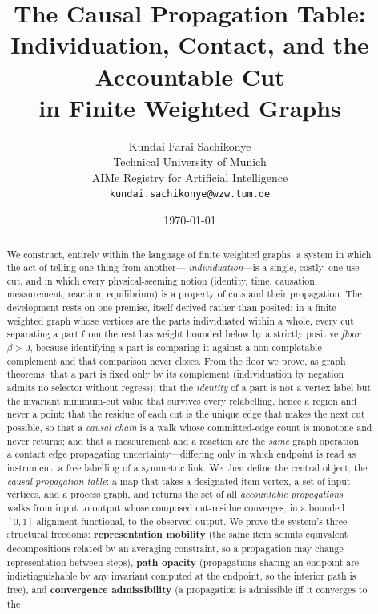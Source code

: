 \documentclass[11pt,twocolumn,a4paper]{article}
\title{\textbf{The Causal Propagation Table:\\[3pt]
Individuation, Contact, and the Accountable Cut\\
in Finite Weighted Graphs}}
\author{%
Kundai Farai Sachikonye\\
\small Technical University of Munich\\
\small AIMe Registry for Artificial Intelligence\\
\small \texttt{kundai.sachikonye@wzw.tum.de}}
\date{\today}
\theoremstyle{thmstyle}
\theoremstyle{definition}
\theoremstyle{remark}
\newcommand{\flo}{\beta}                 %
\begin{document}
\maketitle

\begin{abstract}
\noindent
We construct, entirely within the language of finite weighted graphs, a
system in which the act of telling one thing from another---%
\emph{individuation}---is a single, costly, one-use cut, and in which
every physical-seeming notion (identity, time, causation, measurement,
reaction, equilibrium) is a property of cuts and their propagation. The
development rests on one premise, itself derived rather than posited: in a
finite weighted graph whose vertices are the parts individuated within a
whole, every cut separating a part from the rest has weight bounded below
by a strictly positive \emph{floor} $\flo>0$, because identifying a part
is comparing it against a non-completable complement and that comparison
never closes. From the floor we prove, as graph theorems: that a part is
fixed only by its complement (individuation by negation admits no
selector without regress); that the \emph{identity} of a part is not a
vertex label but the invariant minimum-cut value that survives every
relabelling, hence a region and never a point; that the residue of each
cut is the unique edge that makes the next cut possible, so that a
\emph{causal chain} is a walk whose committed-edge count is monotone and
never returns; and that a measurement and a reaction are the \emph{same}
graph operation---a contact edge propagating uncertainty---differing only
in which endpoint is read as instrument, a free labelling of a symmetric
link. We then define the central object, the \emph{causal propagation
table}: a map that takes a designated item vertex, a set of input
vertices, and a process graph, and returns the set of all
\emph{accountable propagations}---walks from input to output whose
composed cut-residue converges, in a bounded $[0,1]$ alignment functional,
to the observed output. We prove the system's three structural freedoms:
\textbf{representation mobility} (the same item admits equivalent
decompositions related by an averaging constraint, so a propagation may
change representation between steps), \textbf{path opacity} (propagations
sharing an endpoint are indistinguishable by any invariant computed at the
endpoint, so the interior path is free), and \textbf{convergence
admissibility} (a propagation is admissible iff it converges to the

\end{abstract}
\end{document}
